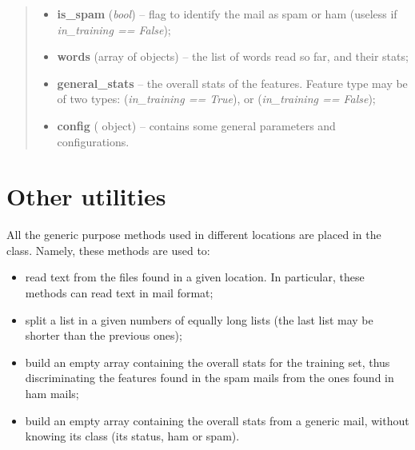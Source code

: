 \documentclass[letterpaper,10pt,english]{sphinxmanual}
\begin{document}
\begin{fulllineitems}
\begin{fulllineitems}
\begin{quote}
\begin{description}
\begin{itemize}
\item {} 
\textbf{is\_spam} (\emph{bool}) -- flag to identify the mail as spam or ham (useless if             \emph{in\_training == False});

\item {} 
\textbf{words} (array of {\hyperref[index:gen_stat.Word]{}} objects) -- the list of words read so far, and their stats;

\item {} 
\textbf{general\_stats} -- the overall stats of the features. Feature type may be            of two types:                {\hyperref[index:gen_stat.Stat]{}} (\emph{in\_training == True}), or                {\hyperref[index:test_stat.Test_stat]{}} (\emph{in\_training == False});

\item {} 
\textbf{config} ({\hyperref[index:config.Config]{}} object) -- contains some general parameters and configurations.

\end{itemize}

\end{description}\end{quote}

\end{fulllineitems}


\end{fulllineitems}



\section{Other utilities}
\label{index:other-utilities}
All the generic purpose methods used in different locations are placed in the {\hyperref[index:utils.Utils]{}} class. Namely, these methods are used to:
\begin{itemize}
\item {} 
read text from the files found in a given location. In particular, these methods can read text in mail format;

\item {} 
split a list in a given numbers of equally long lists (the last list may be shorter than the previous ones);

\item {} 
build an empty array containing the overall stats for the training set, thus discriminating the features found in the spam mails from the ones found in ham mails;

\item {} 
build an empty array containing the overall stats from a generic mail, without knowing its class (its status, ham or spam).

\end{itemize}
\end{document}
